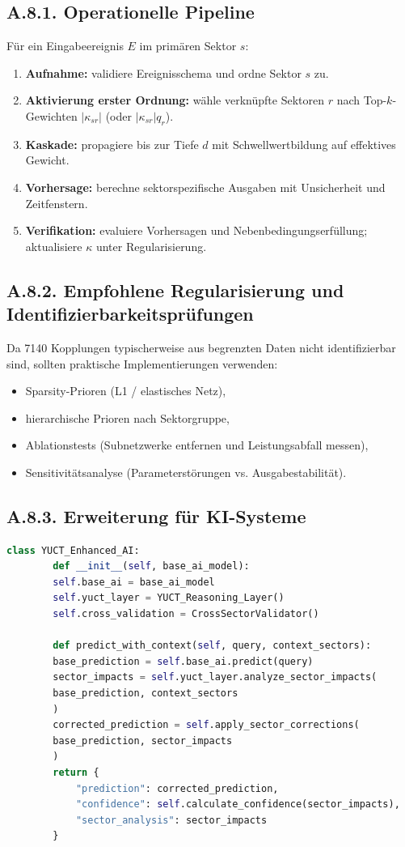 \documentclass[13pt,a4paper]{article}
\begin{document}
	\subsection*{A.8.1. Operationelle Pipeline}
	Für ein Eingabeereignis $E$ im primären Sektor $s$:
	\begin{enumerate}[leftmargin=*]
		\item \textbf{Aufnahme:} validiere Ereignisschema und ordne Sektor $s$ zu.
		\item \textbf{Aktivierung erster Ordnung:} wähle verknüpfte Sektoren $r$ nach Top-$k$-Gewichten $|\kappa_{sr}|$ (oder $|\kappa_{sr}|q_r$).
		\item \textbf{Kaskade:} propagiere bis zur Tiefe $d$ mit Schwellwertbildung auf effektives Gewicht.
		\item \textbf{Vorhersage:} berechne sektorspezifische Ausgaben mit Unsicherheit und Zeitfenstern.
		\item \textbf{Verifikation:} evaluiere Vorhersagen und Nebenbedingungserfüllung; aktualisiere $\kappa$ unter Regularisierung.
	\end{enumerate}
	
	\subsection*{A.8.2. Empfohlene Regularisierung und Identifizierbarkeitsprüfungen}
	Da 7140 Kopplungen typischerweise aus begrenzten Daten nicht identifizierbar sind, sollten praktische Implementierungen verwenden:
	\begin{itemize}[leftmargin=*]
		\item Sparsity-Prioren (L1 / elastisches Netz),
		\item hierarchische Prioren nach Sektorgruppe,
		\item Ablationstests (Subnetzwerke entfernen und Leistungsabfall messen),
		\item Sensitivitätsanalyse (Parameterstörungen vs. Ausgabestabilität).
	\end{itemize}
	
	\subsection*{A.8.3. Erweiterung für KI-Systeme}
	
	\begin{lstlisting}[language=Python]
		class YUCT_Enhanced_AI:
		def __init__(self, base_ai_model):
		self.base_ai = base_ai_model
		self.yuct_layer = YUCT_Reasoning_Layer()
		self.cross_validation = CrossSectorValidator()
		
		def predict_with_context(self, query, context_sectors):
		base_prediction = self.base_ai.predict(query)
		sector_impacts = self.yuct_layer.analyze_sector_impacts(
		base_prediction, context_sectors
		)
		corrected_prediction = self.apply_sector_corrections(
		base_prediction, sector_impacts
		)
		return {
			"prediction": corrected_prediction,
			"confidence": self.calculate_confidence(sector_impacts),
			"sector_analysis": sector_impacts
		}
	\end{lstlisting}
	
\end{document}
